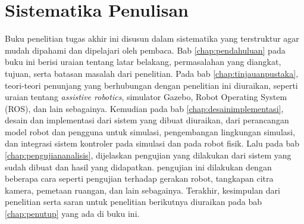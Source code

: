 \section{Sistematika Penulisan}
\label{sec:sistematikapenulisan}

Buku penelitian tugas akhir ini disusun dalam sistematika yang terstruktur agar mudah dipahami dan dipelajari oleh pembaca.
Bab \ref{chap:pendahuluan} pada buku ini berisi uraian tentang latar belakang, permasalahan yang diangkat, tujuan, serta batasan masalah dari penelitian.
Pada bab \ref{chap:tinjauanpustaka}, teori-teori penunjang yang berhubungan dengan penelitian ini diuraikan,
  seperti uraian tentang \emph{assistive robotics}, simulator Gazebo, Robot Operating System (ROS),
  dan lain sebagainya.
Kemudian pada bab \ref{chap:desainimplementasi}, desain dan implementasi dari sistem yang dibuat diuraikan,
  dari perancangan model robot dan pengguna untuk simulasi, pengembangan lingkungan simulasi,
  dan integrasi sistem kontroler pada simulasi dan pada robot fisik.
Lalu pada bab \ref{chap:pengujiananalisis}, dijelaskan pengujian yang dilakukan dari sistem yang sudah dibuat dan hasil yang didapatkan.
pengujian ini dilakukan dengan beberapa cara seperti pengujian terhadap gerakan robot,
  tangkapan citra kamera, pemetaan ruangan, dan lain sebagainya.
Terakhir, kesimpulan dari penelitian serta saran untuk penelitian berikutnya diuraikan pada bab \ref{chap:penutup} yang ada di buku ini.
